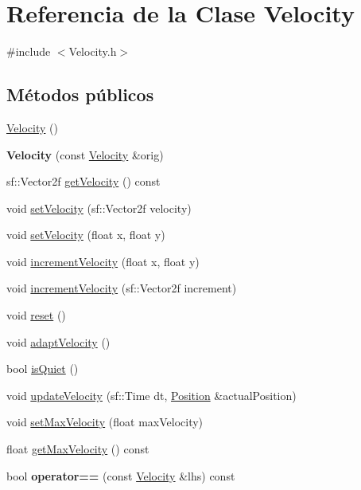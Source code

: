 \hypertarget{classVelocity}{}\section{Referencia de la Clase Velocity}
\label{classVelocity}


{\ttfamily \#include $<$Velocity.\+h$>$}

\subsection*{Métodos públicos}
\begin{DoxyCompactItemize}
\item 
\hyperlink{classVelocity_a852088c8d4dbb7e1beb0d793a57e9d11}{Velocity} ()
\item 
\hypertarget{classVelocity_a10d752c066ae650a16d268a6009ee0b4}{}{\bfseries Velocity} (const \hyperlink{classVelocity}{Velocity} \&orig)\label{classVelocity_a10d752c066ae650a16d268a6009ee0b4}

\item 
sf\+::\+Vector2f \hyperlink{classVelocity_abd0a1d55e1ac76b6d46a4f28ead90c2c}{get\+Velocity} () const 
\item 
void \hyperlink{classVelocity_a0ce0664468ac1eb751953baffc50f192}{set\+Velocity} (sf\+::\+Vector2f velocity)
\item 
void \hyperlink{classVelocity_a52612183dd88deb4d9689d2eccbcd617}{set\+Velocity} (float x, float y)
\item 
void \hyperlink{classVelocity_a1a8f54c80262f620b04b5d7c69a50ceb}{increment\+Velocity} (float x, float y)
\item 
void \hyperlink{classVelocity_a9c123f5b61a0aa525c5a3c20d2304ca2}{increment\+Velocity} (sf\+::\+Vector2f increment)
\item 
void \hyperlink{classVelocity_a38b4d47e4a40753978b25e88f596f0f7}{reset} ()
\item 
void \hyperlink{classVelocity_aed44353fe17ecd06f9eece523f53decb}{adapt\+Velocity} ()
\item 
bool \hyperlink{classVelocity_ac012a24f476baebd4cf3a2e41334bc04}{is\+Quiet} ()
\item 
void \hyperlink{classVelocity_a8f57dc2a6c0cd1a576193c73d9fc81eb}{update\+Velocity} (sf\+::\+Time dt, \hyperlink{classPosition}{Position} \&actual\+Position)
\item 
void \hyperlink{classVelocity_a25b531bfad5ec480edccfe6fc9775712}{set\+Max\+Velocity} (float max\+Velocity)
\item 
float \hyperlink{classVelocity_abceb2dcbad96cf374fd72a47a93148b7}{get\+Max\+Velocity} () const 
\item 
\hypertarget{classVelocity_ad26e4fc73af7c3ce8b335d5a7286f682}{}bool {\bfseries operator==} (const \hyperlink{classVelocity}{Velocity} \&lhs) const \label{classVelocity_ad26e4fc73af7c3ce8b335d5a7286f682}


\end{DoxyCompactItemize}
